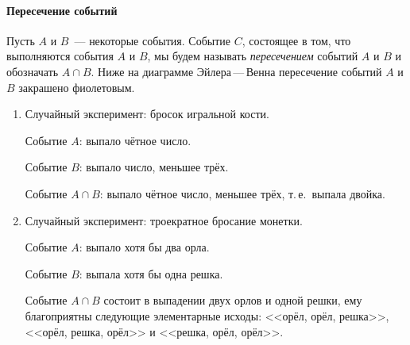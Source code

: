 \documentclass[11pt]{article}
\begin{document}
\newpage

\paragraph{Пересечение событий} Пусть $A$ и $B$~--- некоторые события. Событие $C$, состоящее в том, что выполняются события $A$ и $B$, мы будем называть \emph{пересечением} событий $A$ и $B$ и обозначать $A\cap B$. Ниже на диаграмме Эйлера\,---\,Венна пересечение событий $A$ и $B$ закрашено фиолетовым.

\begin{center}
\end{center}

\begin{examples}
\item[]
\begin{enumerate}
	\item Случайный эксперимент: бросок игральной кости.
	
	Событие $A$: выпало чётное число.
	
	Событие $B$: выпало число, меньшее трёх.
	
	Событие $A\cap B$: выпало чётное число, меньшее трёх, т.\,е.~выпала двойка.

	\item Случайный эксперимент: троекратное бросание монетки.
	
	Событие $A$: выпало хотя бы два орла.
	
	Событие $B$: выпала хотя бы одна решка.
	
	Событие $A\cap B$ состоит в выпадении двух орлов и одной решки, ему благоприятны следующие элементарные исходы: <<орёл, орёл, решка>>, <<орёл, решка, орёл>> и <<решка, орёл, орёл>>.
\end{enumerate}
\end{examples}
\end{document}
